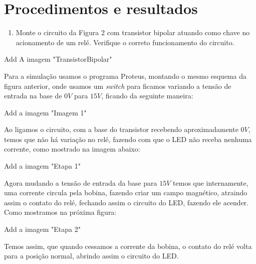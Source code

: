 \setcounter{topnumber}{5}
\setcounter{bottomnumber}{5}
\setcounter{totalnumber}{5}

\chapter{Procedimentos e resultados}

\begin{enumerate}
	\item Monte o circuito da Figura 2 com transistor bipolar atuando como chave no acionamento de um relé. Verifique o correto funcionamento do circuito.
\end{enumerate}
	
	Add A imagem "TransistorBipolar"
	
Para a simulação usamos o programa Proteus, montando o mesmo esquema da figura anterior, onde usamos um \textit{switch}  para ficamos variando a tensão de entrada na base de $ 0 V $ para $ 15 V $, ficando da seguinte maneira:

	Add a imagem "Imagem 1"

Ao ligamos o circuito, com a base do transistor recebendo aproximadamente $ 0 V $, temos que não há variação no relé, fazendo com que o LED não receba nenhuma corrente, como mostrado na imagem abaixo:

	Add a imagem "Etapa 1"
	
Agora mudando a tensão de entrada da base para $ 15 V $ temos que internamente, uma corrente circula pela bobina, fazendo criar um campo magnético, atraindo assim o contato do relé, fechando assim o circuito do LED, fazendo ele acender. Como mostramos na próxima figura:

	Add a imagem "Etapa 2"
	
Temos assim, que quando cessamos a corrente da bobina, o contato do relé volta para a posição normal, abrindo assim o circuito do LED.
	
	

